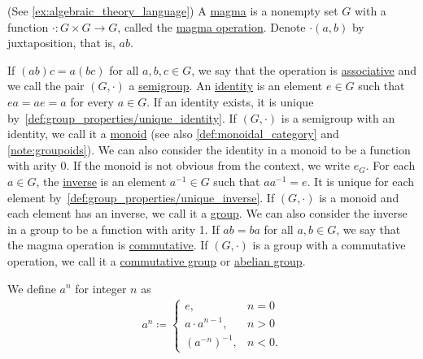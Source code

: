 \begin{definition}\label{def:group}(See \cref{ex:algebraic_theory_language})
  A \uline{magma} is a nonempty set $G$ with a function $\cdot: G \times G \to G$, called the \uline{magma operation}. Denote $\cdot(a, b)$ by juxtaposition, that is, $ab$.

  \begin{description}
     If $(ab)c = a(bc)$ for all $a, b, c \in G$, we say that the operation is \uline{associative} and we call the pair $(G, \cdot)$ a \uline{semigroup}.
     An \uline{identity} is an element $e \in G$ such that $ea = ae = a$ for every $a \in G$. If an identity exists, it is unique by~\cref{def:group_properties/unique_identity}. If $(G, \cdot)$ is a semigroup with an identity, we call it a \uline{monoid} (see also \cref{def:monoidal_category} and \cref{note:groupoids}). We can also consider the identity in a monoid to be a function with arity 0. If the monoid is not obvious from the context, we write $e_G$.
     For each $a \in G$, the \uline{inverse} is an element $a^{-1} \in G$ such that $aa^{-1} = e$. It is unique for each element by~\cref{def:group_properties/unique_inverse}. If $(G, \cdot)$ is a monoid and each element has an inverse, we call it a \uline{group}. We can also consider the inverse in a group to be a function with arity 1.
     If $ab = ba$ for all $a, b \in G$, we say that the magma operation is \uline{commutative}. If $(G, \cdot)$ is a group with a commutative operation, we call it a \uline{commutative group} or \uline{abelian group}.
  \end{description}

  We define $a^n$ for integer $n$ as
  \begin{align*}
    a^n \coloneqq \begin{cases}
      e, &n = 0 \\
      a \cdot a^{n-1}, &n > 0 \\
      (a^{-n})^{-1}, &n < 0.
    \end{cases}
  \end{align*}


\end{definition}
